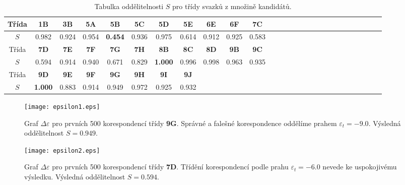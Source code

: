 \begin{table}
\centering
\begin{tabular}{|c|c|c|c|c|c|c|c|c|c|c|c|c|c|c|c|c|c|c|c|c|c|c|c|c|c|c|}
\hline
Třída & \textbf{1B} & \textbf{3B} & \textbf{5A}  & \textbf{5B} & \textbf{5C} & \textbf{5D} & \textbf{5E} & \textbf{6E} & \textbf{6F} & \textbf{7C} \\
\hline
$S$	  & 0.982		& 0.924 	  & 0.954 		 & \textbf{0.454} 	   & 0.936 	     & 0.975 	   & 
0.614 		& 0.912 	  & 0.925 	    & 0.583 \\
\hline 
\cline{1-11}
Třída & \textbf{7D} & \textbf{7E} & \textbf{7F}  & \textbf{7G} & \textbf{7H} & \textbf{8B} & \textbf{8C} & \textbf{8D} & \textbf{9B} & \textbf{9C} \\
\hline
$S$   & 0.594        & 0.914      & 0.940        & 0.671       & 0.829       & \textbf{1.000} & 
0.996        & 0.998      & 0.963       & 0.935 \\
\hline 
\cline{1-8}
Třída & \textbf{9D} & \textbf{9E} & \textbf{9F}  & \textbf{9G} & \textbf{9H} & \textbf{9I} & \textbf{9J} \\
\cline{1-8}
$S$& \textbf{1.000} & 0.883 & 0.914 & 0.949 & 0.972 & 0.925 & 0.932 \\
\cline{1-8}
\end{tabular}
\caption{Tabulka oddělitelnosti $S$ pro třídy svazků z množině kandidátů.}
\label{table: CritSeperability}
\end{table}




\begin{figure}[htps]
\centering
\texttt{[image: epsilon1.eps]}
\caption{Graf $\Delta\varepsilon$ pro prvních 500 korespondencí třídy \textbf{9G}. Správné a falešné korespondence oddělíme prahem $\varepsilon_t = -9.0$. Výsledná oddělitelnost $S = 0.949$.}
\label{fig: epsilon1}
\end{figure}

\begin{figure}[htps]
\centering
\texttt{[image: epsilon2.eps]}
\caption{Graf $\Delta\varepsilon$ pro prvních 500 korespondencí třídy \textbf{7D}. Třídění korespondencí podle prahu $\varepsilon_t = -6.0$ nevede ke uspokojivému výsledku. Výsledná oddělitelnost $S = 0.594$.}
\label{fig: epsilon2}
\end{figure}

\clearpage